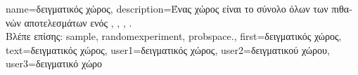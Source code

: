   {name={\foreignlanguage{greek}{δειγματικός χώρος}}, 
  	description={\foreignlanguage{greek}{Ένας}  
		\foreignlanguage{greek}{χώρος είναι το σύνολο όλων των πιθανών αποτελεσμάτων ενός} 
		 \cite{BillingsleyProbMeasure}, 
		\cite{BertsekasProb}, \cite{papoulis}, \cite{AshProbMeasure}. \\
 		\foreignlanguage{greek}{Βλέπε επίσης:} \gls{sample}, \gls{randomexperiment}, \gls{probspace}.},  
  	first={\foreignlanguage{greek}{δειγματικός χώρος}}, 
  	text={\foreignlanguage{greek}{δειγματικός χώρος}}, 
	user1={\foreignlanguage{greek}{δειγματικός χώρος}}, %
  	user2={\foreignlanguage{greek}{δειγματικού χώρου}}, %
	user3={\foreignlanguage{greek}{δειγματικό χώρο}} %
  }

